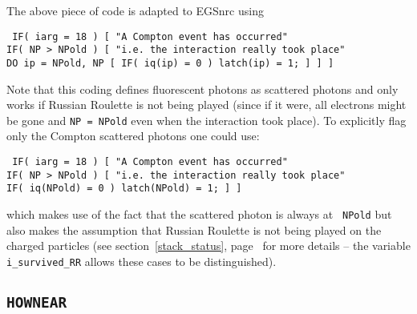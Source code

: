 The above piece of code is adapted to EGSnrc using
\begin{flushleft}{\tt
IF( iarg = 18 ) [ "A Compton event has occurred" \\
\quad IF( NP > NPold ) [ "i.e. the interaction really took place" \\
\quad \quad DO ip = NPold, NP [
IF( iq(ip) = 0 ) latch(ip) = 1; ] ] ] } 
\end{flushleft}
Note that this coding defines fluorescent photons as scattered photons and
only works if Russian Roulette is not being played (since if it were, all
electrons might be gone and {\tt NP = NPold} even when the interaction took
place). To
explicitly  flag only the Compton scattered photons one could use:
\begin{flushleft}{\tt
IF( iarg = 18 ) [ "A Compton event has occurred" \\
\quad IF( NP > NPold ) [ "i.e. the interaction really took place" \\
\quad \quad IF( iq(NPold) = 0 ) latch(NPold) = 1; ] ]  }
\end{flushleft}
which makes use of the fact that the scattered photon is always at {\tt
NPold} but also makes the assumption that Russian Roulette is not being
played on the charged particles (see
section~\ref{stack_status}, page~\pageref{stack_status} for more
details -- the variable {\tt i\_survived\_RR} allows these cases to be
distinguished).


\subsection{\tt HOWNEAR}
\label{hownear_change}

